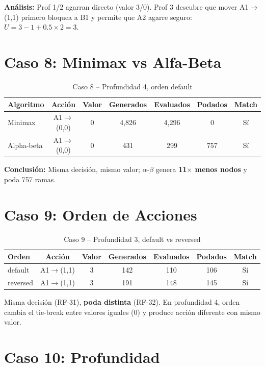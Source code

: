 \textbf{Análisis:} Prof 1/2 agarran directo (valor 3/0). Prof 3 descubre que mover A1$\to$(1,1)
primero bloquea a B1 y permite que A2 agarre seguro: $U = 3 - 1 + 0.5\times2 = 3$.

\section{Caso 8: Minimax vs Alfa-Beta}
\label{sec:caso8-detalle}

\begin{table}[H]
\centering
\caption{Caso 8 -- Profundidad 4, orden default}
\begin{tabular}{lcccccc}
\toprule
Algoritmo & Acción & Valor & Generados & Evaluados & Podados & Match \\
\midrule
Minimax & A1$\to$(0,0) & 0 & 4,826 & 4,296 & 0 & Sí \\
Alpha-beta & A1$\to$(0,0) & 0 & 431 & 299 & 757 & Sí \\
\bottomrule
\end{tabular}
\end{table}

\textbf{Conclusión:} Misma decisión, mismo valor; $\alpha$-$\beta$ genera \textbf{11$\times$ menos
nodos} y poda 757 ramas.

\section{Caso 9: Orden de Acciones}
\label{sec:caso9-detalle}

\begin{table}[H]
\centering
\caption{Caso 9 -- Profundidad 3, default vs reversed}
\begin{tabular}{lcccccc}
\toprule
Orden & Acción & Valor & Generados & Evaluados & Podados & Match \\
\midrule
default & A1$\to$(1,1) & 3 & 142 & 110 & 106 & Sí \\
reversed & A1$\to$(1,1) & 3 & 191 & 148 & 145 & Sí \\
\bottomrule
\end{tabular}
\end{table}

Misma decisión (RF-31), \textbf{poda distinta} (RF-32). En profundidad 4, orden 
cambia el tie-break entre valores iguales (0) y produce acción diferente con mismo valor.

\section{Caso 10: Profundidad}
\label{sec:caso10-detalle}

